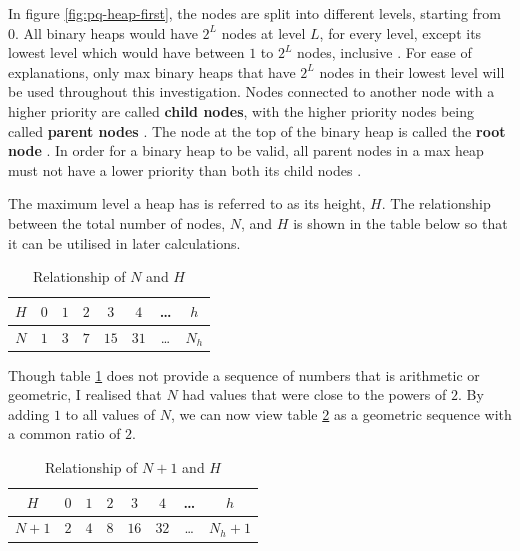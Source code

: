 \documentclass[12pt]{article}
\begin{document}
In figure \ref{fig:pq-heap-first}, the nodes are split into different levels, starting from $0$. All binary heaps would have $2^L$ nodes at level $L$, for every level, except its lowest level which would have between $1$ to $2^L$ nodes, inclusive \parencite{cornell_fall_2020}. For ease of explanations, only max binary heaps that have $2^L$ nodes in their lowest level will be used throughout this investigation. Nodes connected to another node with a higher priority are called \textbf{child nodes}, with the higher priority nodes being called \textbf{parent nodes} \parencite{cornell_fall_2020}. The node at the top of the binary heap is called the \textbf{root node} \parencite{cornell_fall_2020}. In order for a binary heap to be valid, all parent nodes in a max heap must not have a lower priority than both its child nodes \parencite{cornell_fall_2020}.\newline

The maximum level a heap has is referred to as its height, $H$. The relationship between the total number of nodes, $N$, and $H$ is shown in the table below so that it can be utilised in later calculations.\vspace{0.5em}

\begin{table}[H]
    \centering
    \caption{Relationship of $N$ and $H$}
    \bgroup
    \setlength{\tabcolsep}{15pt}
    \renewcommand{\arraystretch}{1.1}
    \begin{tabular}{|c|c|c|c|c|c|c|c|}
        \hline
        $H$ & $0$ & $1$ & $2$ & $3$ & $4$ & \dots & $h$\\
        \hline
        $N$ & $1$ & $3$ & $7$ & $15$ & $31$ & \dots & $N_h$\\
        \hline
    \end{tabular}
    \egroup
    \label{tab:Rel-N&H}
\end{table}

Though table \ref{tab:Rel-N&H} does not provide a sequence of numbers that is arithmetic or geometric, I realised that $N$ had values that were close to the powers of $2$. By adding $1$ to all values of $N$, we can now view table \ref{tab:Rel-N+1&H} as a geometric sequence with a common ratio of $2$.

\begin{table}[H]
    \centering
    \caption{Relationship of $N+1$ and $H$}
    \bgroup
    \setlength{\tabcolsep}{15pt}
    \renewcommand{\arraystretch}{1.1}
    \begin{tabular}{|c|c|c|c|c|c|c|c|}
        \hline
        $H$ & $0$ & $1$ & $2$ & $3$ & $4$ & \dots & $h$\\
        \hline
        $N+1$ & $2$ & $4$ & $8$ & $16$ & $32$ & \dots & $N_h+1$\\
        \hline
    \end{tabular}
    \egroup
    \label{tab:Rel-N+1&H}
\end{table}
\end{document}

